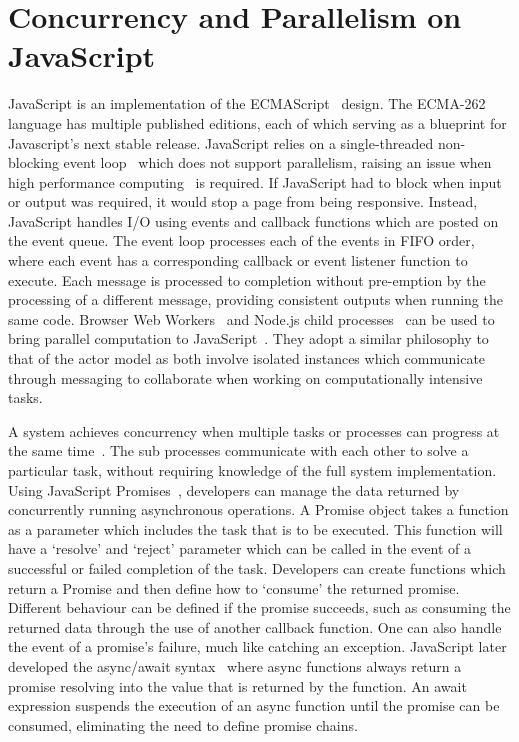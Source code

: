 \documentclass[oneside]{um-fict}
\begin{document}
\section{Concurrency and Parallelism on JavaScript}
JavaScript is an implementation of the ECMAScript~\cite{ecmascript} design. The ECMA-262 language has multiple published editions, each of which serving as a blueprint for Javascript's next stable release. JavaScript relies on a single-threaded non-blocking event loop~\cite{eventloopbrowser, eventloopnode} which does not support parallelism, raising an issue when high performance computing~\cite{highperformance} is required. If JavaScript had to block when input or output was required, it would stop a page from being responsive. Instead, JavaScript handles I/O using events and callback functions which are posted on the event queue. The event loop processes each of the events in FIFO order, where each event has a corresponding callback or event listener function to execute. Each message is processed to completion without pre-emption by the processing of a different message, providing consistent outputs when running the same code. Browser Web Workers~\cite{webworkers} and Node.js child processes~\cite{nodejs, cluster} can be used to bring parallel computation to JavaScript~\cite{concurrencyjs, spidersjs}. They adopt a similar philosophy to that of the actor model as both involve isolated instances which communicate through messaging to collaborate when working on computationally intensive tasks. 

A system achieves concurrency when multiple tasks or processes can progress at the same time~\cite{concurrency}. The sub processes communicate with each other to solve a particular task, without requiring knowledge of the full system implementation. Using JavaScript Promises~\cite{promises}, developers can manage the data returned by concurrently running asynchronous operations. A Promise object takes a function as a parameter which includes the task that is to be executed. This function will have a `resolve' and `reject' parameter which can be called in the event of a successful or failed completion of the task. Developers can create functions which return a Promise and then define how to `consume' the returned promise. Different behaviour can be defined if the promise succeeds, such as consuming the returned data through the use of another callback function. One can also handle the event of a promise's failure, much like catching an exception. JavaScript later developed the async/await syntax~\cite{async} where async functions always return a promise resolving into the value that is returned by the function. An await expression suspends the execution of an async function until the promise can be consumed, eliminating the need to define promise chains.
\end{document}
